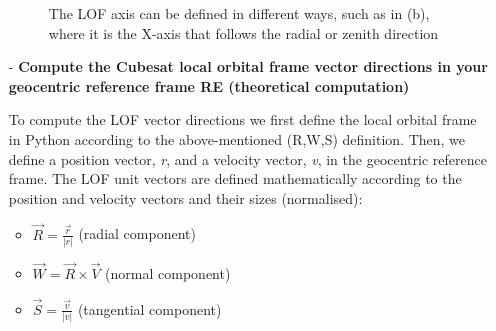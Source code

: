 \begin{itemize}
    \begin{figure}[h]
        \centering
        \caption{The LOF axis can be defined in different ways, such as in (b), where it is the X-axis that follows the radial or zenith direction \cite{ISAE_frames}}
    \end{figure}
    
    
    \newpage
    \item[-] \textbf{Compute the Cubesat local orbital frame vector directions in your geocentric reference frame RE (theoretical computation)}
    
    To compute the LOF vector directions we first define the local orbital frame in Python according to the above-mentioned (R,W,S) definition.
    Then, we define a position vector, \textit{r}, and a velocity vector, \textit{v}, in the geocentric reference frame.
    The LOF unit vectors are defined mathematically according to the position and velocity vectors and their sizes (normalised):
    \begin{itemize}
        \item $\vec{R} = \frac{\vec{r}}{|r|}$ \qquad \qquad (radial component)
        \item $\vec{W} = \vec{R} \times \vec{V}$ \qquad (normal component)
        \item $\vec{S} = \frac{\vec{v}}{|v|}$ \qquad \qquad (tangential component)
    \end{itemize}


\end{itemize}
